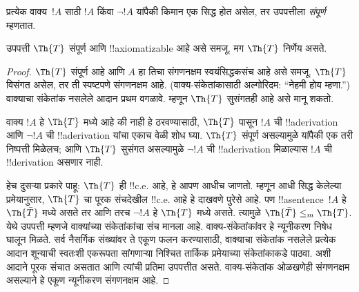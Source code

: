 \documentclass[../../../include/open-logic-section]{subfiles}
\begin{document}


प्रत्येक वाक्य~$!A$ साठी $!A$ किंवा $\lnot !A$ यांपैकी
किमान एक सिद्ध होत असेल, तर उपपत्तीला {\em संपूर्ण} म्हणतात.

\begin{lem}
उपपत्ती $\Th{T}$ संपूर्ण आणि !!{axiomatizable} आहे असे समजू.
मग $\Th{T}$ निर्णेय असते.
\end{lem}

\begin{proof}
$\Th{T}$ संपूर्ण आहे आणि $A$ हा तिचा संगणनक्षम स्वयंसिद्धकसंच
आहे असे समजू. $\Th{T}$ विसंगत असेल, तर ती स्पष्टपणे संगणनक्षम
आहे. (वाक्य-संकेतांकासाठी अल्गोरिदम: ``नेहमी होय म्हणा.'')
वाक्याचा संकेतांक नसलेले आदान प्रथम वगळावे. म्हणून $\Th{T}$
सुसंगतही आहे असे मानू शकतो.

वाक्य $!A$ हे $\Th{T}$ मध्ये आहे की नाही हे ठरवण्यासाठी,
$\Th{T}$ पासून $!A$ ची !!a{derivation} आणि
$\lnot !A$ ची !!a{derivation} यांचा एकाच वेळी शोध घ्या.
$\Th{T}$ संपूर्ण असल्यामुळे यांपैकी एक तरी निष्पत्ती मिळेलच;
आणि $\Th{T}$ सुसंगत असल्यामुळे $\lnot !A$ ची
!!a{derivation} मिळाल्यास $!A$ ची !!{derivation} असणार नाही.

हेच दुसऱ्या प्रकारे पाहू: $\Th{T}$ ही !!{c.e.} आहे, हे आपण
आधीच जाणतो. म्हणून आधी सिद्ध केलेल्या प्रमेयानुसार,
$\Th{T}$ चा पूरक संचदेखील !!{c.e.} आहे हे दाखवणे पुरेसे आहे.
पण !!a{sentence}~$!A$ हे $\Th{\bar
T}$ मध्ये असते तर आणि तरच $\lnot !A$ हे $\Th{T}$
मध्ये असते. त्यामुळे $\Th{\bar T} \leq_m
\Th{T}$.
येथे उपपत्ती म्हणजे वाक्यांच्या संकेतांकांचा संच मानला आहे.
वाक्य-संकेतांकांवर हे न्यूनीकरण निषेध घालून मिळते. सर्व नैसर्गिक
संख्यांवर ते एकूण फलन करण्यासाठी, वाक्याचा संकेतांक नसलेले
प्रत्येक आदान शून्याची स्वतःशी एकरूपता सांगणाऱ्या निश्चित
तार्किक प्रमेयाच्या संकेतांकाकडे पाठवा. अशी आदाने पूरक संचात
असतात आणि त्यांची प्रतिमा उपपत्तीत असते. वाक्य-संकेतांक
ओळखणेही संगणनक्षम असल्याने हे एकूण न्यूनीकरण संगणनक्षम आहे.
\end{proof}
\end{document}

